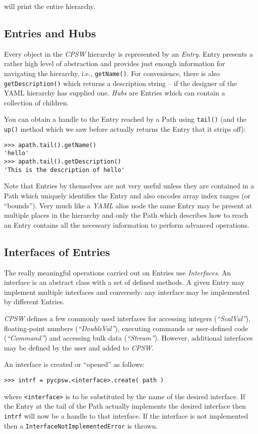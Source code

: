 \documentclass[10pt]{article}
\newcommand{\ita}[1]{\emph{#1}}
\newcommand{\cpsw}      {\ita {CPSW}}
\newcommand{\yaml}      {\ita {YAML}}
\newcommand{\entry}     {{Entry}}
\newcommand{\entries}   {{Entries}}
\newcommand{\hubs}      {{Hubs}}
\newcommand{\Path}      {{Path}}
\newcommand{\cod}[1] {{\tt#1}}
\begin{document}
will print the entire hierarchy.

\subsection{Entries and Hubs}
Every object in the \cpsw{} hierarchy is represented by an {\em \entry{}}. \entry{} presents
a rather high level of abstraction and provides just enough information for navigating
the hierarchy, i.e., \cod{getName()}. For convenience, there is also \cod{getDescription()}
which returns a description string -- if the designer of the YAML hierarchy has supplied
one. {\em \hubs{}} are \entries{} which can contain a collection of children.

You can obtain a handle to the \entry{} reached by a \Path{} using \cod{tail()}
(and the \cod{up()} method which we saw before actually returns the \entry{} that
it strips off):

\begin{verbatim}
>>> apath.tail().getName()
'hello'
>>> apath.tail().getDescription()
'This is the description of hello'
\end{verbatim}

Note that \entries{} by themselves are not very useful unless they are contained in
a \Path{} which uniquely identifies the \entry{} and also encodes array index
ranges (or ``bounds'').
Very much like a \yaml{} alias node the same \entry{} may be present at
multiple places in the hierarchy and only the \Path{} which describes how to reach
an \entry{} contains all the necessary information to perform advanced operations.

\subsection{Interfaces of Entries}
The really meaningful operations carried out on \entries{} use {\em Interfaces}.
An interface is an abstract class with a set of defined methods. A given \entry{}
may implement multiple interfaces and conversely: any interface may be implemented
by different \entries{}.

\cpsw{} defines a few commonly used interfaces for accessing integers ({\em ``ScalVal''}),
floating-point numbers ({\em ``DoubleVal''}), executing commands or user-defined code
({\em ``Command''}) and accessing bulk data ({\em ``Stream''}). However, additional
interfaces may be defined by the user and added to \cpsw{}.

An interface is created or ``opened'' as follows:
\begin{verbatim}
>>> intrf = pycpsw.<interface>.create( path )
\end{verbatim}
where \cod{<interface>} is to be substituted by the name of the desired interface.
If the \entry{} at the tail of the \Path{} actually implements the desired interface
then \cod{intrf} will now be a handle to that interface. If the interface is not
implemented then a \cod{InterfaceNotImplementedError} is thrown.
\end{document}
